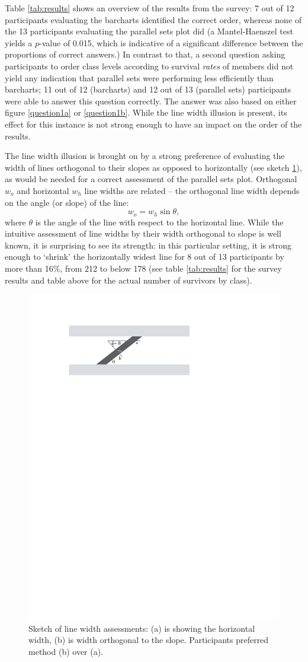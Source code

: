 Table \ref{tab:results} shows an overview of the results from the survey: 7 out of 12 participants evaluating the barcharts identified the correct order, whereas none of the 13 participants evaluating the parallel sets plot did (a Mantel-Haenszel test yields a $p$-value of 0.015, which is indicative of a significant difference between the proportions of correct answers.)
In contrast to that, a second question asking participants to order class levels according to survival {\it rates} of members did not yield any indication that parallel sets were performing less efficiently than barcharts; 11 out of 12 (barcharts) and 12 out of 13 (parallel sets) participants were able to answer this question correctly. The answer was also based on either figure \ref{question1a} or \ref{question1b}. While the line width illusion is present, its effect for this instance is not strong enough to have an impact on the order of the results.

The line width illusion is brought on by a strong preference of evaluating the width of lines orthogonal to their slopes as opposed to horizontally (see sketch \ref{fig:linewidth}), as would be needed for a correct assessment of the parallel sets plot.
Orthogonal $w_o$ and horizontal $w_h$ line widths are related -- the orthogonal line width depends on the angle (or slope) of the line:
\[
w_o = w_h \sin \theta,
\]
where $\theta$ is the angle of the line with respect to the horizontal line.
While the intuitive assessment of line widths by their width orthogonal to slope is well known, it is surprising to see its strength: in this particular setting, it is strong enough to `shrink' the horizontally widest line for 8 out of 13 participants by more than 16\%, from 212 to below 178 (see table \ref{tab:results} for the survey results and table above for the actual number of survivors by class). 

\begin{figure}[htbp]
\begin{center}
\includegraphics[width=0.6\linewidth]{images/linewidth}
\end{center}
\caption{\label{fig:linewidth}Sketch of line width assessments: (a) is showing the horizontal width, (b) is  width orthogonal to the slope. Participants preferred method (b) over (a).}
\end{figure}

